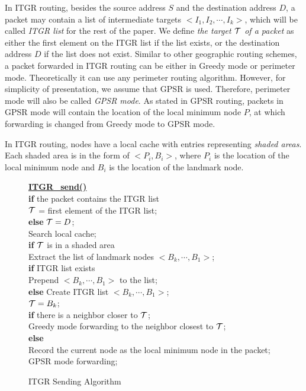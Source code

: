 \documentclass[3p,times]{elsarticle}
\begin{document}
In ITGR routing,
besides the source address $S$ and the destination address $D$,
a packet may contain
a list of intermediate targets $<I_1, I_2, \cdots, I_k>$,
which will be called {\em ITGR list} for the rest of the paper.
We define {\em the target ${\cal T}$ of a packet} as either the first element on the
ITGR list if the list exists, or the destination address $D$ if the list
does not exist.
Similar to other geographic routing schemes, a packet
forwarded in ITGR routing can be either in
Greedy mode or perimeter mode.
Theoretically it can
use any perimeter routing algorithm. However, for simplicity of
presentation, we assume that GPSR is used. Therefore, perimeter mode will also be
called {\em GPSR mode}.
As stated in GPSR routing, packets in GPSR mode will contain the location
of the local minimum node $P$, at which forwarding is changed
from Greedy mode to GPSR mode.

In ITGR routing, nodes have a local cache with
entries representing {\em shaded areas}.
Each shaded area is in the form of
$<P_i, B_i>$, where $P_i$ is
the location of the local minimum node and $B_i$
is the location of the landmark node.



\begin{figure}[hbt]
\baselineskip=10.2pt
{\small
  \noindent\underline{\bf ITGR\_send()} \\
  \text{~~~~}\textbf{if} the packet contains the ITGR list \\
  \text{~~~~~~~~}${\cal T}$ = first element of the ITGR list; \\
  \text{~~~~}\textbf{else} ${\cal T} = D$; \\
  \text{~~~~}Search local cache; \\
  \text{~~~~}\textbf{if} ${\cal T}$ is in a shaded area \\
  \text{~~~~~~~~}Extract the list of landmark nodes $<B_k, \cdots,B_1>$; \\
  \text{~~~~~~~~}\textbf{if} ITGR list exists \\
  \text{~~~~~~~~~~~~}Prepend $<B_k, \cdots,B_1>$ to the list; \\
  \text{~~~~~~~~}\textbf{else} Create ITGR list $<B_k, \cdots,B_1>$;\\
  \text{~~~~~~~~}${\cal T} = B_k$; \\
  \text{~~~~}\textbf{if} there is a neighbor closer to ${\cal T}$; \\
  \text{~~~~~~~~}Greedy mode forwarding to the neighbor closest to ${\cal T}$; \\
  \text{~~~~}\textbf{else}\\
  \text{~~~~~~~~}Record the current node as the local minimum node in the packet; \\
  \text{~~~~~~~~}GPSR mode forwarding; \\
}

\protect\caption{ITGR Sending Algorithm}
\protect\label{routingfig}
\end{figure}
\end{document}
